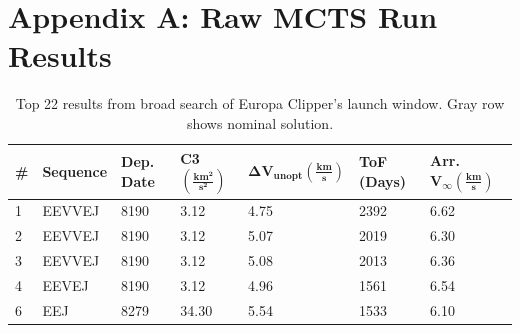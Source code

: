 \documentclass[letterpaper, preprint, paper,11pt]{AAS}	%
\begin{document}
\section{Appendix A: Raw MCTS Run Results}
\begin{table}[h!]
    \centering
    \caption{Top 22 results from broad search of Europa Clipper's launch window. Gray row shows nominal solution.}
    \begin{tabular}{lllllll}
        \toprule
        \textbf{\textbf{\#}}\hspace{2em} & \textbf{\textbf{Sequence}} & \textbf{Dep. Date}\footnotemark[1] & \textbf{\textbf{C3} $\boldsymbol{(\frac{km^2}{s^2})}$} & \textbf{$\boldsymbol{\Delta V_{unopt} (\frac{km}{s})}$} & \textbf{\textbf{ToF (Days) }} & \textbf{\textbf{Arr.} $\boldsymbol{V_\infty (\frac{km}{s})}$} \\
        \midrule
        1                           & EEVVEJ                     & 8190                            & 3.12                                                   & 4.75                                                    & 2392                       & 6.62                                                             \\
        2                           & EEVVEJ                     & 8190                            & 3.12                                                   & 5.07                                                    & 2019                       & 6.30                                                             \\
        3                           & EEVVEJ                     & 8190                            & 3.12                                                   & 5.08                                                    & 2013                       & 6.36                                                             \\
        4                           & EEVEJ                      & 8190                            & 3.12                                                   & 4.96                                                    & 1561                       & 6.54                                                             \\
        6                           & EEJ                        & 8279                            & 34.30                                                  & 5.54                                                    & 1533                       & 6.10                                                             \\

\end{tabular}
\end{table}
\end{document}
